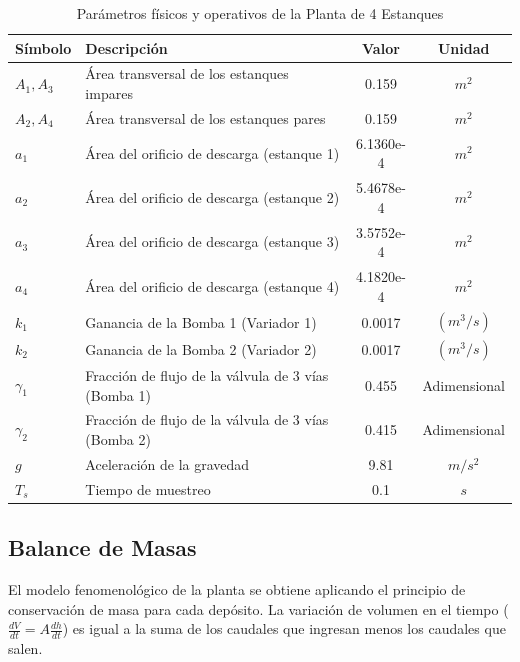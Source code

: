 \begin{table}[ht]
    \centering
    \caption{Parámetros físicos y operativos de la Planta de 4 Estanques}
    \label{tab:parametros}
    \renewcommand{\arraystretch}{1.2} %
    \begin{tabular}{llcc}
        \hline
        \textbf{Símbolo} & \textbf{Descripción} & \textbf{Valor} & \textbf{Unidad} \\
        \hline
        $A_1, A_3$ & Área transversal de los estanques impares & 0.159 & $m^2$ \\
        $A_2, A_4$ & Área transversal de los estanques pares & 0.159 & $m^2$ \\
        $a_1$ & Área del orificio de descarga (estanque 1) &  6.1360e-4 & $m^2$ \\
        $a_2$ & Área del orificio de descarga (estanque 2) & 5.4678e-4  & $m^2$ \\
        $a_3$ & Área del orificio de descarga (estanque 3) &  3.5752e-4 & $m^2$ \\
        $a_4$ & Área del orificio de descarga (estanque 4) &  4.1820e-4 & $m^2$ \\
        $k_1$ & Ganancia de la Bomba 1 (Variador 1) & 0.0017 & $(m^3/s)$ \\
        $k_2$ & Ganancia de la Bomba 2 (Variador 2) & 0.0017 & $(m^3/s)$ \\
        $\gamma_1$ & Fracción de flujo de la válvula de 3 vías (Bomba 1) & 0.455 & Adimensional \\
        $\gamma_2$ & Fracción de flujo de la válvula de 3 vías (Bomba 2) & 0.415 & Adimensional \\
        $g$ & Aceleración de la gravedad & 9.81 & $m/s^2$ \\
        $T_s$ & Tiempo de muestreo & 0.1 & $s$ \\
        \hline
    \end{tabular}
\end{table}

\clearpage
\subsection{Balance de Masas} %

El modelo fenomenológico de la planta se obtiene aplicando el principio de conservación de masa para cada depósito. La variación de volumen en el tiempo ($\frac{dV}{dt} = A \frac{dh}{dt}$) es igual a la suma de los caudales que ingresan menos los caudales que salen. 

